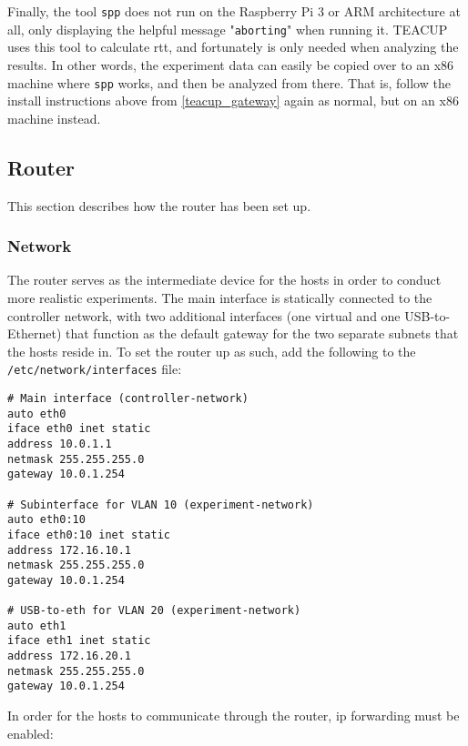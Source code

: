 Finally, the tool \lstinline{spp} does not run on the Raspberry Pi 3 or ARM architecture at all, only displaying the helpful message "\lstinline{aborting}" when running it. TEACUP uses this tool to calculate \gls{rtt}, and fortunately is only needed when analyzing the results. In other words, the experiment data can easily be copied over to an x86 machine where \lstinline{spp} works, and then be analyzed from there. That is, follow the install instructions above from \ref{teacup_gateway} again as normal, but on an x86 machine instead.








\subsection{Router}

This section describes how the router has been set up. 


\subsubsection{Network}

The router serves as the intermediate device for the hosts in order to conduct more realistic experiments. The main interface is statically connected to the controller network, with two additional interfaces (one virtual and one USB-to-Ethernet) that function as the default gateway for the two separate subnets that the hosts reside in. To set the router up as such, add the following to the \lstinline{/etc/network/interfaces} file:

\begin{verbatim}
# Main interface (controller-network)
auto eth0
iface eth0 inet static
address 10.0.1.1
netmask 255.255.255.0
gateway 10.0.1.254

# Subinterface for VLAN 10 (experiment-network)
auto eth0:10
iface eth0:10 inet static
address 172.16.10.1
netmask 255.255.255.0
gateway 10.0.1.254

# USB-to-eth for VLAN 20 (experiment-network)
auto eth1
iface eth1 inet static
address 172.16.20.1
netmask 255.255.255.0
gateway 10.0.1.254
\end{verbatim}

In order for the hosts to communicate through the router, \gls{ip} forwarding must be enabled:

